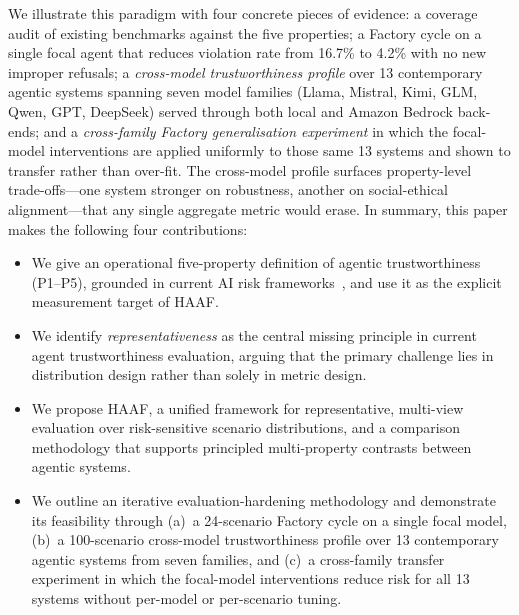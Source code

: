 We illustrate this paradigm with four concrete pieces of evidence: a coverage audit of existing benchmarks against the five properties; a Factory cycle on a single focal agent that reduces violation rate from 16.7\% to 4.2\% with no new improper refusals; a \emph{cross-model trustworthiness profile} over 13 contemporary agentic systems spanning seven model families (Llama, Mistral, Kimi, GLM, Qwen, GPT, DeepSeek) served through both local and Amazon Bedrock back-ends; and a \emph{cross-family Factory generalisation experiment} in which the focal-model interventions are applied uniformly to those same 13 systems and shown to transfer rather than over-fit. The cross-model profile surfaces property-level trade-offs---one system stronger on robustness, another on social-ethical alignment---that any single aggregate metric would erase. In summary, this paper makes the following four contributions:
\begin{itemize}[leftmargin=*]
\item We give an operational five-property definition of agentic trustworthiness (P1--P5), grounded in current AI risk frameworks~\cite{nist2023airmf,eu2024aiact}, and use it as the explicit measurement target of HAAF.
\item We identify \emph{representativeness} as the central missing principle in current agent trustworthiness evaluation, arguing that the primary challenge lies in distribution design rather than solely in metric design.
\item We propose HAAF, a unified framework for representative, multi-view evaluation over risk-sensitive scenario distributions, and a comparison methodology that supports principled multi-property contrasts between agentic systems.
\item We outline an iterative evaluation-hardening methodology and demonstrate its feasibility through (a)~a 24-scenario Factory cycle on a single focal model, (b)~a 100-scenario cross-model trustworthiness profile over 13 contemporary agentic systems from seven families, and (c)~a cross-family transfer experiment in which the focal-model interventions reduce risk for all 13 systems without per-model or per-scenario tuning.
\end{itemize}
